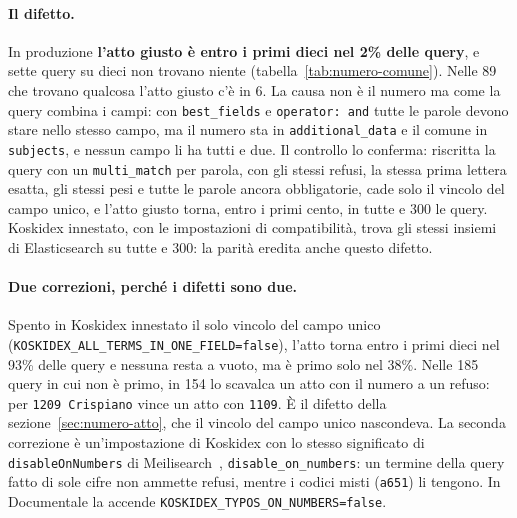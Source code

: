\paragraph{Il difetto.} In produzione \textbf{l'atto giusto è entro i primi dieci
nel 2\% delle query}, e sette query su dieci non trovano niente
(tabella~\ref{tab:numero-comune}). Nelle 89 che trovano qualcosa l'atto giusto c'è
in 6. La causa non è il numero ma come la query combina i campi: con
\texttt{best\_fields} e \texttt{operator: and} tutte le parole devono stare nello
stesso campo, ma il numero sta in \texttt{additional\_data} e il comune in
\texttt{subjects}, e nessun campo li ha tutti e due. Il controllo lo conferma:
riscritta la query con un \texttt{multi\_match} per parola, con gli stessi refusi,
la stessa prima lettera esatta, gli stessi pesi e tutte le parole ancora
obbligatorie, cade solo il vincolo del campo unico, e l'atto giusto torna, entro i primi cento, in
tutte e 300 le query. Koskidex innestato, con le impostazioni di compatibilità,
trova gli stessi insiemi di Elasticsearch su tutte e 300: la parità eredita
anche questo difetto.

\paragraph{Due correzioni, perché i difetti sono due.} Spento in Koskidex
innestato il solo vincolo del campo unico
(\texttt{KOSKIDEX\_ALL\_TERMS\_IN\_ONE\_FIELD=false}), l'atto torna entro i primi
dieci nel 93\% delle query e nessuna resta a vuoto, ma è primo solo nel 38\%.
Nelle 185 query in cui non è primo, in 154 lo scavalca un atto con il numero a un
refuso: per \texttt{1209 Crispiano} vince un atto con \texttt{1109}. È il difetto
della sezione~\ref{sec:numero-atto}, che il vincolo del campo unico nascondeva.
La seconda correzione è un'impostazione di Koskidex con lo stesso significato
di \texttt{disableOnNumbers} di Meilisearch~\cite{meili-typo},
\texttt{disable\_on\_numbers}: un termine della query fatto di sole cifre non
ammette refusi, mentre i codici misti (\texttt{a651}) li tengono. In Documentale
la accende \texttt{KOSKIDEX\_TYPOS\_ON\_NUMBERS=false}.

